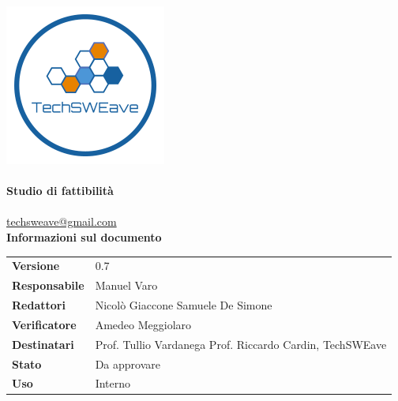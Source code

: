\documentclass[a4paper]{article}
\begin{document}
\begin{titlepage}
    \begin{center}
        \includegraphics{../../../Images/logo}\\
        \vspace{20px}
        \textcolor{logo}{\hrulefill}\\
        \vspace{20px}
        \textbf{\huge\textcolor{logo}{Studio di fattibilità}}\\
        \vspace{10px}
        \textcolor{logo}{\hrulefill}\\
        \vspace{20px}
        \href{mailto:techsweave@gmail.com}{techsweave@gmail.com}\\
        \vspace{40px}
        \textbf{\Large Informazioni sul documento}\\
        \vspace{20px}
        \begin{tabular}{p{100px} | p{100px}}
            \textbf{Versione} & 0.7\\
            \textbf{Responsabile} & Manuel Varo\\
            \textbf{Redattori} & Nicolò Giaccone \newline Samuele De Simone\\
            \textbf{Verificatore} & Amedeo Meggiolaro\\
            \textbf{Destinatari} & Prof. Tullio Vardanega \newline Prof. Riccardo Cardin, \newline TechSWEave\\
            \textbf{Stato} & Da approvare\\
            \textbf{Uso} & Interno\\
        \end{tabular}

    \end{center}
    \end{titlepage}
\end{document}
